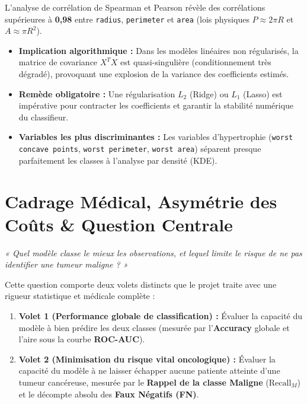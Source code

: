 \documentclass[10pt,a4paper]{article}
\begin{document}
\begin{tcolorbox}[amberbox, title={Découverte EDA Cruciale : La Multicolinéarité Géométrique Extrême}]
\small
L'analyse de corrélation de Spearman et Pearson révèle des corrélations supérieures à \textbf{0,98} entre \texttt{radius}, \texttt{perimeter} et \texttt{area} (lois physiques $P \approx 2\pi R$ et $A \approx \pi R^2$).
\begin{itemize}[leftmargin=0.5cm, itemsep=1pt]
	\item \textbf{Implication algorithmique :} Dans les modèles linéaires non régularisés, la matrice de covariance $X^T X$ est quasi-singulière (conditionnement très dégradé), provoquant une explosion de la variance des coefficients estimés.
	\item \textbf{Remède obligatoire :} Une régularisation $L_2$ (Ridge) ou $L_1$ (Lasso) est impérative pour contracter les coefficients et garantir la stabilité numérique du classifieur.
	\item \textbf{Variables les plus discriminantes :} Les variables d'hypertrophie (\texttt{worst concave points}, \texttt{worst perimeter}, \texttt{worst area}) séparent presque parfaitement les classes à l'analyse par densité (KDE).
\end{itemize}
\end{tcolorbox}

\section{Cadrage Médical, Asymétrie des Coûts \& Question Centrale}

\begin{tcolorbox}[greenbox, title={La Question Centrale Formulée par l'INSEA}]
\centering\large\itshape
« Quel modèle classe le mieux les observations, et lequel limite le risque de ne pas identifier une tumeur maligne ? »
\end{tcolorbox}

\noindent
Cette question comporte deux volets distincts que le projet traite avec une rigueur statistique et médicale complète :
\begin{enumerate}[itemsep=3pt]
	\item \textbf{Volet 1 (Performance globale de classification) :} Évaluer la capacité du modèle à bien prédire les deux classes (mesurée par l'\textbf{Accuracy} globale et l'aire sous la courbe \textbf{ROC-AUC}).
	\item \textbf{Volet 2 (Minimisation du risque vital oncologique) :} Évaluer la capacité du modèle à ne laisser échapper aucune patiente atteinte d'une tumeur cancéreuse, mesurée par le \textbf{Rappel de la classe Maligne} ($\text{Recall}_M$) et le décompte absolu des \textbf{Faux Négatifs (FN)}.
\end{enumerate}
\end{document}
